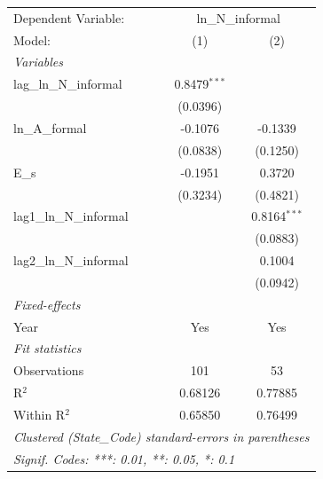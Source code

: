 
\begingroup
\centering
\begin{tabular}{lcc}
   \tabularnewline \midrule \midrule
   Dependent Variable: & \multicolumn{2}{c}{ln\_N\_informal}\\
   Model:                   & (1)            & (2)\\  
   \midrule
   \emph{Variables}\\
   lag\_ln\_N\_informal     & 0.8479$^{***}$ &   \\   
                            & (0.0396)       &   \\   
   ln\_A\_formal            & -0.1076        & -0.1339\\   
                            & (0.0838)       & (0.1250)\\   
   E\_s                     & -0.1951        & 0.3720\\   
                            & (0.3234)       & (0.4821)\\   
   lag1\_ln\_N\_informal    &                & 0.8164$^{***}$\\   
                            &                & (0.0883)\\   
   lag2\_ln\_N\_informal    &                & 0.1004\\   
                            &                & (0.0942)\\   
   \midrule
   \emph{Fixed-effects}\\
   Year                     & Yes            & Yes\\  
   \midrule
   \emph{Fit statistics}\\
   Observations             & 101            & 53\\  
   R$^2$                    & 0.68126        & 0.77885\\  
   Within R$^2$             & 0.65850        & 0.76499\\  
   \midrule \midrule
   \multicolumn{3}{l}{\emph{Clustered (State\_Code) standard-errors in parentheses}}\\
   \multicolumn{3}{l}{\emph{Signif. Codes: ***: 0.01, **: 0.05, *: 0.1}}\\
\end{tabular}
\par\endgroup


